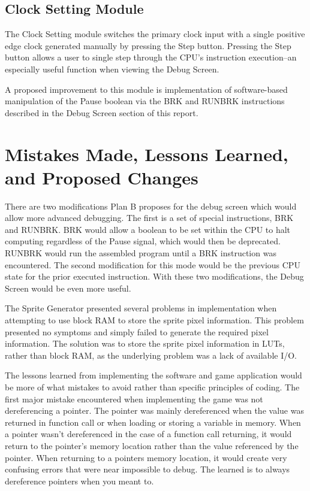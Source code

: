 \documentclass[letterpaper, 11 pt, conference]{article}
\begin{document}
\subsection{Clock Setting Module}

The Clock Setting module switches the primary clock input with a single positive edge clock generated manually by pressing the Step button.  Pressing the Step button allows a user to single step through the CPU's instruction execution--an especially useful function when viewing the Debug Screen.

A proposed improvement to this module is implementation of software-based manipulation of the Pause boolean via the BRK and RUNBRK instructions described in the Debug Screen section of this report.

\section{Mistakes Made, Lessons Learned, and Proposed Changes}
There are two modifications Plan B proposes for the debug screen which would allow more advanced debugging.  The first is a set of special instructions, BRK and RUNBRK.  BRK would allow a boolean to be set within the CPU to halt computing regardless of the Pause signal, which would then be deprecated.  RUNBRK would run the assembled program until a BRK instruction was encountered.  The second modification for this mode would be the previous CPU state for the prior executed instruction.  With these two modifications, the Debug Screen would be even more useful.

The Sprite Generator presented several problems in implementation when attempting to use block RAM to store the sprite pixel information.  This problem presented no symptoms and simply failed to generate the required pixel information.  The solution was to store the sprite pixel information in LUTs, rather than block RAM, as the underlying problem was a lack of available I/O.

The lessons learned from implementing the software and game application would be more of what mistakes to avoid rather than specific principles of coding. The first major mistake encountered when implementing the game was not dereferencing a pointer. The pointer was mainly dereferenced when the value was returned in function call or when loading or storing a variable in memory. When a pointer wasn’t dereferenced in the case of a function call returning, it would return to the pointer’s memory location rather than the value referenced by the pointer. When returning to a pointers memory location, it would create very confusing errors that were near impossible to debug. The learned is to always dereference pointers when you meant to.
\end{document}
